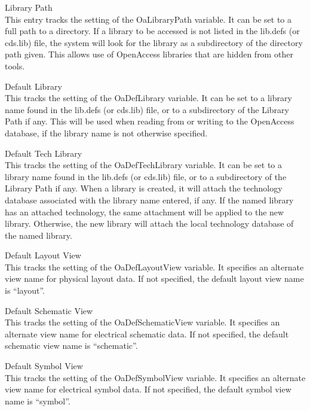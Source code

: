 \begin{description}
\item{\cb Library Path}\\
This entry tracks the setting of the {\et OaLibraryPath} variable.  It
can be set to a full path to a directory.  If a library to be accessed
is not listed in the {\vt lib.defs} (or {\vt cds.lib}) file, the
system will look for the library as a subdirectory of the directory
path given.  This allows use of OpenAccess libraries that are hidden
from other tools.

\item{\cb Default Library}\\
This tracks the setting of the {\et OaDefLibrary} variable.  It can be
set to a library name found in the {\vt lib.defs} (or {\vt cds.lib})
file, or to a subdirectory of the {\cb Library Path} if any.  This
will be used when reading from or writing to the OpenAccess database,
if the library name is not otherwise specified.

\item{\cb Default Tech Library}\\
This tracks the setting of the {\cb OaDefTechLibrary} variable.  It
can be set to a library name found in the {\vt lib.defs} (or {\vt
cds.lib}) file, or to a subdirectory of the {\cb Library Path} if any. 
When a library is created, it will attach the technology database
associated with the library name entered, if any.  If the named
library has an attached technology, the same attachment will be
applied to the new library.  Otherwise, the new library will attach
the local technology database of the named library.

\item{\cb Default Layout View}\\
This tracks the setting of the {\et OaDefLayoutView} variable.  It
specifies an alternate view name for physical layout data.  If not
specified, the default layout view name is ``{\vt layout}''.

\item{\cb Default Schematic View}\\
This tracks the setting of the {\et OaDefSchematicView} variable.  It
specifies an alternate view name for electrical schematic data.  If
not specified, the default schematic view name is ``{\vt schematic}''.

\item{\cb Default Symbol View}\\
This tracks the setting of the {\et OaDefSymbolView} variable.  It
specifies an alternate view name for electrical symbol data.  If not
specified, the default symbol view name is ``{\vt symbol}''. 


\end{description}
